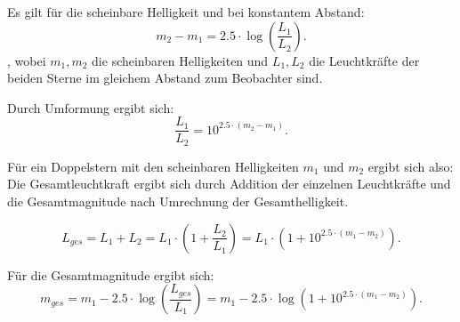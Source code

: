 Es gilt für die scheinbare Helligkeit und bei konstantem Abstand: 
\begin{equation}
m_2 - m_1 = 2.5\cdot \log(\frac{L_1}{L_2}). 
\end{equation}, 
wobei $m_1, m_2$ die scheinbaren Helligkeiten und $L_1, L_2$  die Leuchtkräfte der beiden Sterne im gleichem Abstand zum Beobachter sind.

Durch Umformung ergibt sich: 
\begin{equation}
\frac{L_1}{L_2} = 10^{2.5 \cdot (m_2 - m_1)}. 
\end{equation}

Für ein Doppelstern mit den scheinbaren Helligkeiten $m_1$ und $m_2$ ergibt sich also: 
Die Gesamtleuchtkraft ergibt sich durch Addition der einzelnen Leuchtkräfte und die Gesamtmagnitude nach Umrechnung der Gesamthelligkeit. 

\begin{equation}
L_{ges} = L_1 + L_2 = L_1 \cdot (1 + \frac{L_2}{L_1}) = L_1 \cdot (1 + 10^{2.5 \cdot (m_1 - m_2)}). 
\end{equation}

Für die Gesamtmagnitude ergibt sich:
\begin{equation}
m_{ges} = m_1 - 2.5\cdot \log(\frac{L_{ges}}{L_1}) = m_1 - 2.5\cdot \log(1 + 10^{2.5 \cdot (m_1 - m_2)}).
\end{equation}